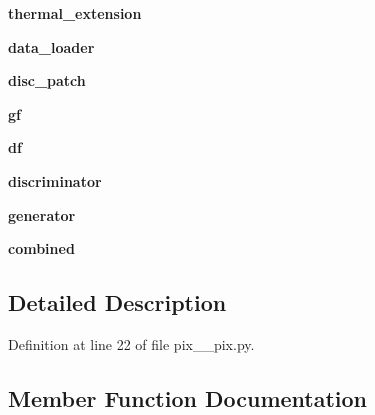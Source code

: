 \begin{DoxyCompactItemize}
{\bfseries thermal\+\_\+extension}
\item 
\mbox{\label{classmodels_1_1pix__2__pix_1_1Pix2Pix_ae9d16fc1d385888ffc974eccb2996343}} 
{\bfseries data\+\_\+loader}
\item 
\mbox{\label{classmodels_1_1pix__2__pix_1_1Pix2Pix_a7890fb7ae807d2091dcf68e3f34719bd}} 
{\bfseries disc\+\_\+patch}
\item 
\mbox{\label{classmodels_1_1pix__2__pix_1_1Pix2Pix_ae7b3fc8cea157d7e3b297b9d3d1a81bc}} 
{\bfseries gf}
\item 
\mbox{\label{classmodels_1_1pix__2__pix_1_1Pix2Pix_a079f2d9df1500e7bd3e8d4b7db6cef89}} 
{\bfseries df}
\item 
\mbox{\label{classmodels_1_1pix__2__pix_1_1Pix2Pix_a65b57a1d90592c1b412b49808e585d1b}} 
{\bfseries discriminator}
\item 
\mbox{\label{classmodels_1_1pix__2__pix_1_1Pix2Pix_a7bb1c7c1613f3f060a84715169893b43}} 
{\bfseries generator}
\item 
\mbox{\label{classmodels_1_1pix__2__pix_1_1Pix2Pix_ac4ea51c6e25a2966b22b96923cd2a593}} 
{\bfseries combined}
\end{DoxyCompactItemize}


\subsection{Detailed Description}


Definition at line 22 of file pix\+\_\+\_\+pix.\+py.



\subsection{Member Function Documentation}
\mbox{\label{classmodels_1_1pix__2__pix_1_1Pix2Pix_a12423923b4b88603514bd31c9a3eab6c}} 
